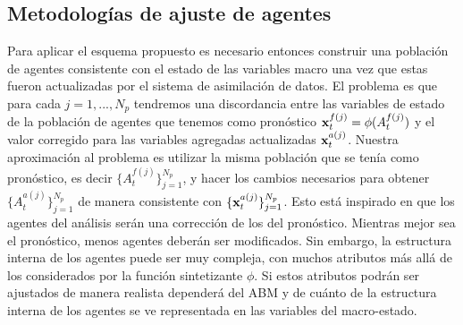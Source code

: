 \subsection{Metodologías de ajuste de agentes} \label{sec:agents_adjustment}

Para aplicar el esquema propuesto es necesario entonces construir una población de agentes consistente con el estado de las variables macro una vez que estas fueron actualizadas por el sistema de asimilación de datos. El problema es que para cada $j = 1, ..., N_p$ tendremos una discordancia entre las variables de estado de la población de agentes que tenemos como pronóstico $\mathbf{x}_t^{f(j)} = \phi (A_t^{f(j)})$ y el valor corregido para las variables agregadas actualizadas $\mathbf{x}_t^{a(j)}$. Nuestra aproximación al problema es utilizar la misma población que se tenía como pronóstico, es decir $\{A_t^{f(j)}\}_{j=1}^{N_p}$, y hacer los cambios necesarios para obtener $\{A_t^{a(j)}\}_{j=1}^{N_p}$ de manera consistente con $\{\mathbf{x}_t^{a(j)}\}_{j=1}^{N_p}$. Esto está inspirado en que los agentes del análisis serán una corrección de los del pronóstico. Mientras mejor sea el pronóstico, menos agentes deberán ser modificados. Sin embargo, la estructura interna de los agentes puede ser muy compleja, con muchos atributos más allá de los considerados por la función sintetizante $\phi$. Si estos atributos podrán ser ajustados de manera realista dependerá del ABM y de cuánto de la estructura interna de los agentes se ve representada en las variables del macro-estado.

